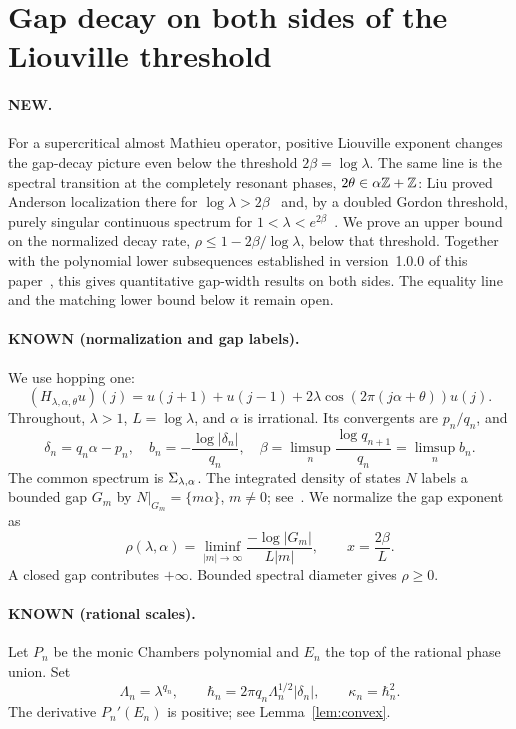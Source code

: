 \section{Gap decay on both sides of the Liouville threshold}\label{sec:intro}
\paragraph{NEW.}
For a supercritical almost Mathieu operator, positive Liouville exponent changes the gap-decay picture even below the threshold $2\beta=\log\lambda$. The same line is the spectral transition at the completely resonant phases, $2\theta\in\alpha\mathbb Z+\mathbb Z$: Liu proved Anderson localization there for $\log\lambda>2\beta$~\cite{Liu2022} and, by a doubled Gordon threshold, purely singular continuous spectrum for $1<\lambda<e^{2\beta}$~\cite{Liu2026}. We prove an upper bound on the normalized decay rate, $\rho\le1-2\beta/\log\lambda$, below that threshold. Together with the polynomial lower subsequences established in version~1.0.0 of this paper~\cite{PaperDv1}, this gives quantitative gap-width results on both sides. The equality line and the matching lower bound below it remain open.

\paragraph{KNOWN (normalization and gap labels).}
We use hopping one:
\begin{equation}\label{eq:H}
(H_{\lambda,\alpha,\theta}u)(j)=u(j+1)+u(j-1)
 +2\lambda\cos(2\pi(j\alpha+\theta))u(j).
\end{equation}
Throughout, $\lambda>1$, $L=\log\lambda$, and $\alpha$ is irrational. Its convergents are $p_n/q_n$, and
\begin{equation}\label{eq:arithmetic}
\delta_n=q_n\alpha-p_n,\quad b_n=-\frac{\log|\delta_n|}{q_n},
\quad \beta=\limsup_n\frac{\log q_{n+1}}{q_n}=\limsup_n b_n.
\end{equation}
The common spectrum is $\Sigma_{\lambda,\alpha}$. The integrated density of states $N$ labels a bounded gap $G_m$ by $N|_{G_m}=\{m\alpha\}$, $m\ne0$; see~\cite{AvronSimon,AYZdry}. We normalize the gap exponent as
\begin{equation}\label{eq:rho}
\rho(\lambda,\alpha)=\liminf_{|m|\to\infty}
 \frac{-\log|G_m|}{L|m|},\qquad x=\frac{2\beta}{L}.
\end{equation}
A closed gap contributes $+\infty$. Bounded spectral diameter gives $\rho\ge0$.

\paragraph{KNOWN (rational scales).}
Let $P_n$ be the monic Chambers polynomial and $E_n$ the top of the rational phase union. Set
\begin{equation}\label{eq:scales}
\Lambda_n=\lambda^{q_n},\qquad
\hbar_n=2\pi q_n\Lambda_n^{1/2}|\delta_n|,\qquad
\kappa_n=\hbar_n^2.
\end{equation}
The derivative $P_n'(E_n)$ is positive; see Lemma~\ref{lem:convex}.


